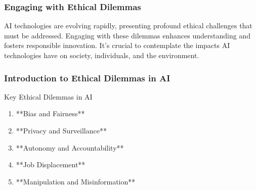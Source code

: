 \documentclass[aspectratio=169]{beamer}
\begin{document}
\begin{frame}[fragile]
    \frametitle{Engaging with Ethical Dilemmas}
    AI technologies are evolving rapidly, presenting profound ethical challenges that must be addressed. Engaging with these dilemmas enhances understanding and fosters responsible innovation. It's crucial to contemplate the impacts AI technologies have on society, individuals, and the environment.
\end{frame}

\begin{frame}[fragile]
    \frametitle{Introduction to Ethical Dilemmas in AI}
    \begin{block}{Key Ethical Dilemmas in AI}
        \begin{enumerate}
            \item **Bias and Fairness**
            \item **Privacy and Surveillance**
            \item **Autonomy and Accountability**
            \item **Job Displacement**
            \item **Manipulation and Misinformation**
        \end{enumerate}
    \end{block}
\end{frame}
\end{document}

